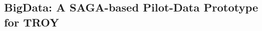 \documentclass[conference,final]{IEEEtran}
\newcommand{\jhanote}[1]{ {\textcolor{red} { ***shantenu: #1 }}}
\newcommand{\alnote}[1]{ {\textcolor{blue} { ***andre: #1 }}}
\newcommand{\msnote}[1]{ {\textcolor{cyan} { ***mark: #1 }}}
\newcommand{\alnote}[1]{}
\newcommand{\jhanote}[1]{}
\newcommand{\msnote}[1]{}
\newcommand{\upp}{\vspace*{-0.5em}}
\begin{document}
% 
% 
% 
% 
% 
% 

\upp
\subsection{BigData: A SAGA-based Pilot-Data Prototype for TROY\upp\upp}
\label{sec:bigdata}
\end{document}

